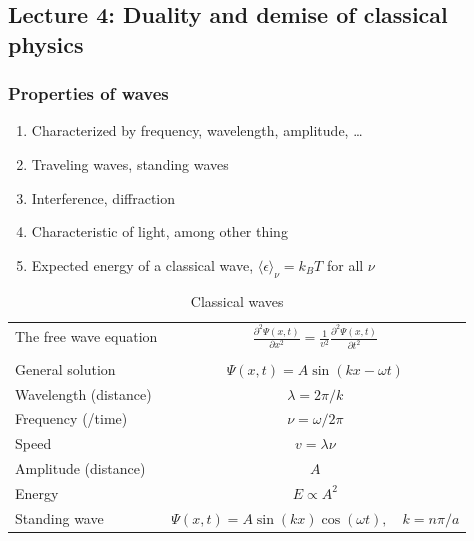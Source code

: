 \documentclass[11pt]{article}
\begin{document}
\subsection{Lecture 4: Duality and demise of classical physics}
\label{sec:org080ca4a}
\subsubsection{Properties of waves}
\label{sec:org454e435}
\begin{enumerate}
\item Characterized by frequency, wavelength, amplitude, \ldots
\item Traveling waves, standing waves
\item Interference, diffraction
\item Characteristic of light, among other thing
\item Expected energy of a classical wave, \(\langle \epsilon \rangle _\nu = k_B T\) for all \(\nu\)
\end{enumerate}

\begin{table}
\begin{center}
    \caption{Classical waves}
    \begin{tabular}{|lc|}
     \hline
The free wave equation & $\displaystyle \frac{ \partial^2 \Psi(x,t)}{\partial x^2} = \frac{1}{v^2}\frac{\partial^2 \Psi(x,t)}{\partial t^2}$ \\
\\
General solution & \(\Psi(x,t) = A \sin(kx -\omega t)\) \\
Wavelength (distance) & \( \lambda = 2\pi/k \) \\
Frequency (/time) & \( \nu =\omega/2\pi \) \\
Speed & \( v= \lambda \nu \) \\
Amplitude (distance) & \(A\) \\
Energy & \( E \propto A^2 \) \\
Standing wave & \(\Psi(x,t) = A \sin(kx)\cos(\omega t), \quad k =n\pi/a\) \\
\hline
\end{tabular}
\end{center}
\end{table}
\end{document}
